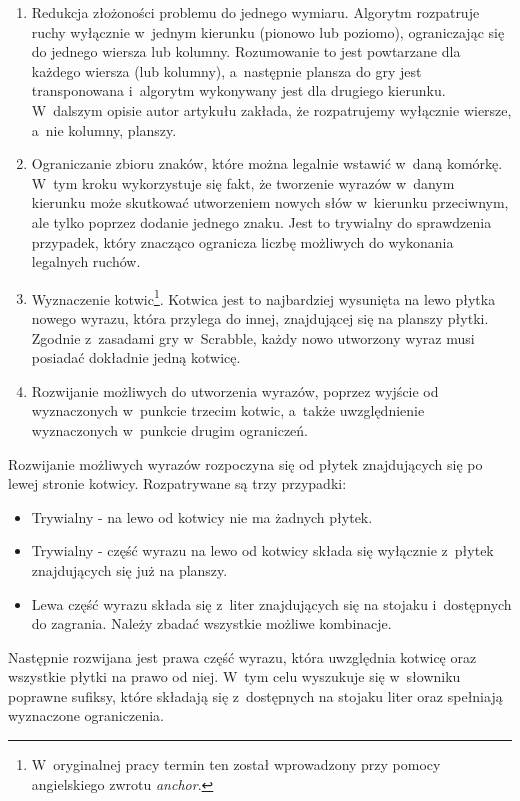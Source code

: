 \documentclass[a4paper,twocolumn,12pt]{article}
\begin{document}
\begin{enumerate}
 \item Redukcja złożoności problemu do jednego wymiaru. Algorytm rozpatruje ruchy wyłącznie w~jednym kierunku (pionowo lub poziomo), ograniczając się do jednego wiersza lub kolumny. Rozumowanie to jest powtarzane dla każdego wiersza (lub kolumny), a~następnie plansza do gry jest transponowana i~algorytm wykonywany jest dla drugiego kierunku. W~dalszym opisie autor artykułu zakłada, że rozpatrujemy wyłącznie wiersze, a~nie kolumny, planszy.
 \item Ograniczanie zbioru znaków, które można legalnie wstawić w~daną komórkę. W~tym kroku wykorzystuje się fakt, że tworzenie wyrazów w~danym kierunku może skutkować utworzeniem nowych słów w~kierunku przeciwnym, ale tylko poprzez dodanie jednego znaku. Jest to trywialny do sprawdzenia przypadek, który znacząco ogranicza liczbę możliwych do wykonania legalnych ruchów.
 \item Wyznaczenie kotwic\footnote{W~oryginalnej pracy termin ten został wprowadzony przy pomocy angielskiego zwrotu \emph{anchor}.}. Kotwica jest to najbardziej wysunięta na lewo płytka nowego wyrazu, która przylega do innej, znajdującej się na planszy płytki. Zgodnie z~zasadami gry w~Scrabble, każdy nowo utworzony wyraz musi posiadać dokładnie jedną kotwicę.
 \item Rozwijanie możliwych do utworzenia wyrazów, poprzez wyjście od wyznaczonych w~punkcie trzecim kotwic, a~także uwzględnienie wyznaczonych w~punkcie drugim ograniczeń. 
\end{enumerate}

Rozwijanie możliwych wyrazów rozpoczyna się od płytek znajdujących się po lewej stronie kotwicy. Rozpatrywane są trzy przypadki:

\begin{itemize}
 \item Trywialny - na lewo od kotwicy nie ma żadnych płytek.
 \item Trywialny - część wyrazu na lewo od kotwicy składa się wyłącznie z~płytek znajdujących się już na planszy.
 \item Lewa część wyrazu składa się z~liter znajdujących się na stojaku i~dostępnych do zagrania. Należy zbadać wszystkie możliwe kombinacje.
\end{itemize}

Następnie rozwijana jest prawa część wyrazu, która uwzględnia kotwicę oraz wszystkie płytki na prawo od niej. W~tym celu wyszukuje się w~słowniku poprawne sufiksy, które składają się z~dostępnych na stojaku liter oraz spełniają wyznaczone ograniczenia.
\end{document}
